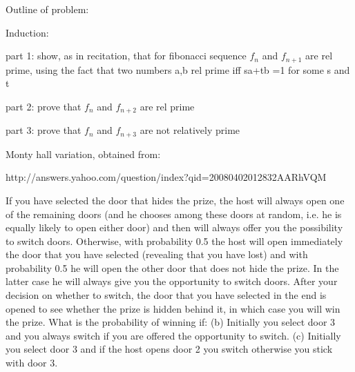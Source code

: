 \documentclass[12pt,oneside]{article}
\begin{document}
\begin{problem}{10}
Outline of problem:

Induction: 

part 1: show, as in recitation, that for fibonacci sequence $f_n$ and $f_{n+1}$ are rel prime, using the fact that two numbers a,b rel prime iff sa+tb =1 for some s and t

part 2: prove that $f_n$ and $f_{n+2}$ are rel prime

part 3: prove that $f_n$ and $f_{n+3 }$ are not relatively prime 
\end{problem}

\newpage

\begin{problem}{10}
Monty hall variation, obtained from:

 http://answers.yahoo.com/question/index?qid=20080402012832AARhVQM

If you have selected the door that hides the prize, the host will always open one of the remaining doors (and he chooses among these doors at random, i.e. he is equally likely to open either door) and then will always offer you the possibility to switch doors. Otherwise, with probability 0.5 the host will open immediately the door that you have selected (revealing that you have lost) and with probability 0.5 he will open the other door that does not hide the prize. In the latter case he will always give you the opportunity to switch doors. After your decision on whether to switch, the door that you have selected in the end is opened to see whether the prize is hidden behind it, in which case you will win the prize.
What is the probability of winning if:
(b) Initially you select door 3 and you always switch if you are offered the opportunity to switch.
(c) Initially you select door 3 and if the host opens door 2 you switch otherwise you stick with door 3.

\end{problem}
\end{document}
